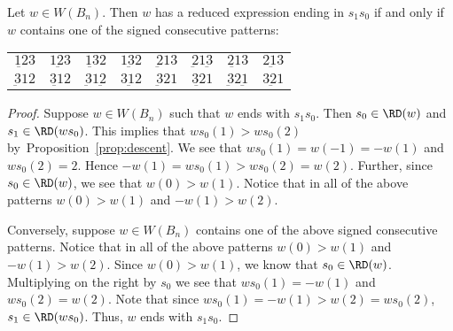 \begin{proposition}\label{lem:endswiths0}
Let $w \in W(B_n)$. Then $w$ has a reduced expression ending in $s_1s_0$ if and only if $w$ contains one of the signed consecutive patterns:
\begin{center}
\begin{tabular}{llllllll}
$\underbar{12}3$ & $\underbar{123}$ & $\underbar{13}2$            & $\underbar{132}$ & $\underbar{2}13$ & $\underbar{2}1\underbar{3}$ & $\underbar{21}3$            & $\underbar{213}$ \\
$\underbar{3}12$ & $\underbar{31}2$ & $\underbar{3}1\underbar{2}$ & $\underbar{312}$ & $\underbar{3}21$ & $\underbar{32}1$            & $\underbar{3}2\underbar{1}$ & $\underbar{321}$
\end{tabular}	
\end{center}

\begin{proof}
	Suppose $w \in W(B_n)$ such that $w$ ends with $s_1s_0$. Then $s_0 \in \RD(w)$ and $s_1 \in \RD(ws_0)$. This implies that $ws_0(1)>ws_0(2)$ by~Proposition~\ref{prop:descent}. We see that $ws_0(1)=w(-1)=-w(1)$ and $ws_0(2)=2$. Hence $-w(1)=ws_0(1)>ws_0(2)=w(2)$. Further, since $s_0 \in \RD(w)$, we see that $w(0)>w(1)$. Notice that in all of the above patterns $w(0)>w(1)$ and $-w(1)>w(2)$.
	
	Conversely, suppose $w \in W(B_n)$ contains one of the above signed consecutive patterns. Notice that in all of the above patterns $w(0)>w(1)$ and $-w(1)>w(2)$. Since $w(0)>w(1)$, we know that $s_0 \in \RD(w)$. Multiplying on the right by $s_0$ we see that $ws_0(1)=-w(1)$ and $ws_0(2)=w(2)$. Note that since $ws_0(1)=-w(1)>w(2)=ws_0(2)$, $s_1 \in \RD(ws_0)$. Thus, $w$ ends with $s_1s_0$. 
\end{proof}
\end{proposition}


